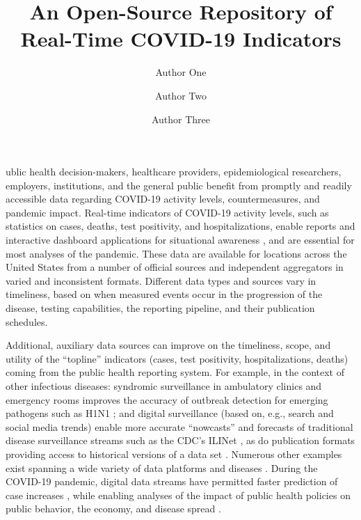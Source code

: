 \documentclass[9pt,twocolumn,twoside,lineno]{pnas-new}
\title{An Open-Source Repository of Real-Time COVID-19 Indicators}
\author[a,c,1]{Author One}
\author[b,1,2]{Author Two}
\author[a]{Author Three}
\affil[a]{Affiliation One}
\affil[b]{Affiliation Two}
\affil[c]{Affiliation Three}
\begin{document}
\maketitle
\thispagestyle{firststyle}

ublic health decision-makers, healthcare providers, epidemiological
researchers, employers, institutions, and the general public benefit from
promptly and readily accessible data regarding COVID-19 activity levels,
countermeasures, and pandemic impact.  Real-time indicators of COVID-19 activity
levels, such as statistics on cases, deaths, test positivity, and
hospitalizations, enable reports and interactive dashboard applications for
situational awareness \cite{Dong:2020, NYTimes, USAFacts}, and are essential for
most analyses of the pandemic.  These data are available for locations across
the United States from a number of official sources and independent aggregators
in varied and inconsistent formats.  Different data types and sources vary in
timeliness, based on when measured events occur in the progression of the
disease, testing capabilities, the reporting pipeline, and their publication
schedules.

Additional, auxiliary data sources can improve on the timeliness, scope, and
utility of the ``topline'' indicators (cases, test positivity, hospitalizations,
deaths) coming from the public health reporting system. For example, in the
context of other infectious diseases: syndromic surveillance in ambulatory
clinics and emergency rooms improves the accuracy of outbreak detection for
emerging pathogens such as H1N1 \cite{Kass-Hout:2012}; and digital surveillance
(based on, e.g., search and social media trends) enable more accurate
``nowcasts'' and forecasts of traditional disease surveillance streams such as
the CDC's ILINet \cite{Santillana:2015, Farrow:2016}, as do publication formats
providing access to historical versions of a data set \cite{Brooks:2018,
  Brooks:2020}. Numerous other examples exist spanning a wide variety of data
platforms and diseases \cite{Browstein:2009, Kass-Hout:2011, Salathe:2012,
  Kass-Hout:2013}. During the COVID-19 pandemic, digital data streams have
permitted faster prediction of case increases \cite{Ahmad:2020, Kogan:2021},
while enabling analyses of the impact of public health policies on public
behavior, the economy, and disease spread \cite{Bonaccorsi:2020, Nouvellet:2021,
  Adjodah:2021, Jewell:2021}.
\end{document}
